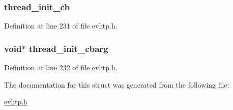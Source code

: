\hypertarget{structevhtp__s_af7bcd46ddf1d6d7dde1383c28f746e97}{
\subsubsection[{thread\_\-init\_\-cb}]{ {\bf thread\_\-init\_\-cb}}}
\label{structevhtp__s_af7bcd46ddf1d6d7dde1383c28f746e97}


Definition at line 231 of file evhtp.h.

\hypertarget{structevhtp__s_aa7d8ed7967f5071085f57741dde79056}{
\subsubsection[{thread\_\-init\_\-cbarg}]{\setlength{\rightskip}{0pt plus 5cm}void$\ast$ {\bf thread\_\-init\_\-cbarg}}}
\label{structevhtp__s_aa7d8ed7967f5071085f57741dde79056}


Definition at line 232 of file evhtp.h.



The documentation for this struct was generated from the following file:\begin{DoxyCompactItemize}
\item 
\hyperlink{evhtp_8h}{evhtp.h}\end{DoxyCompactItemize}
